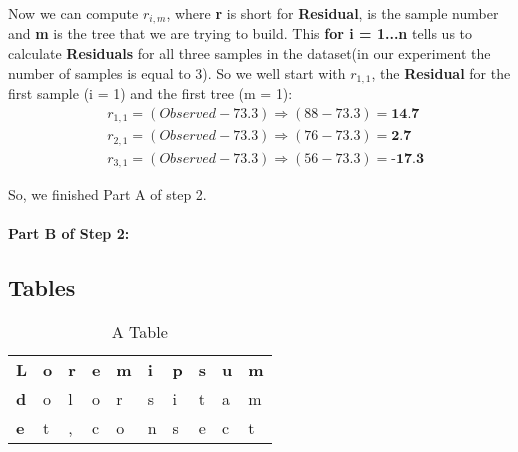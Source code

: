 \documentclass[12pt, a4paper]{article} %
\begin{document}
Now we can compute $r_{i,m}$, where \textbf{r} is short for \textbf{Residual},  is the sample number and \textbf{m} is the tree that we are trying to build. This \textbf{for i = 1...n} tells us to calculate \textbf{Residuals} for all three samples in the dataset(in our experiment the number of samples is equal to 3). So we well start with $r_{1, 1}$, the \textbf{Residual} for the first sample (i = 1) and the first tree (m = 1):
\begin{align*}
    & r_{1, 1} = (Observed - 73.3) \Rightarrow (88 - 73.3) = \textbf{14.7}\\
    & r_{2, 1} = (Observed - 73.3) \Rightarrow (76 - 73.3) = \textbf{2.7}\\
    & r_{3, 1} = (Observed - 73.3) \Rightarrow (56 - 73.3) = \textbf{-17.3}
\end{align*}

So, we finished Part A of step 2.

\paragraph{Part B of Step 2:} 

\subsection{Tables}


\begin{table}[H]
\centering
\caption{A Table}
\label{tab:tbl1}
\begin{tabular}{llllllllll}
\textbf{L}                      & \textbf{o}             & \textbf{r}             & \textbf{e}             & \textbf{m}             & \textbf{i}             & \textbf{p}             & \textbf{s}             & \textbf{u}             & \textbf{m}             \\ \cline{2-10} 
\multicolumn{1}{l|}{\textbf{d}} & \multicolumn{1}{l|}{o} & \multicolumn{1}{l|}{l} & \multicolumn{1}{l|}{o} & \multicolumn{1}{l|}{r} & \multicolumn{1}{l|}{s} & \multicolumn{1}{l|}{i} & \multicolumn{1}{l|}{t} & \multicolumn{1}{l|}{a} & \multicolumn{1}{l|}{m} \\ \cline{2-10} 
\multicolumn{1}{l|}{\textbf{e}} & \multicolumn{1}{l|}{t} & \multicolumn{1}{l|}{,} & \multicolumn{1}{l|}{c} & \multicolumn{1}{l|}{o} & \multicolumn{1}{l|}{n} & \multicolumn{1}{l|}{s} & \multicolumn{1}{l|}{e} & \multicolumn{1}{l|}{c} & \multicolumn{1}{l|}{t} \\ \cline{2-10} 
\end{tabular}
\end{table}
\end{document}
